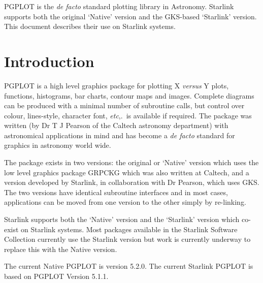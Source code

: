 \documentclass[twoside,11pt]{article}
\newcommand{\stardocinitials}  {SUN}
\newcommand{\stardocnumber}    {15.8}
\newcommand{\stardocabstract}  {PGPLOT is the \emph{de facto} standard plotting
library in Astronomy.  Starlink supports both the original `Native' version and the GKS-based `Starlink' version.  This document describes their use on
Starlink systems.}
\newcommand{\stardocname}{\stardocinitials /\stardocnumber}
\newenvironment{latexonly}{}{}
\newcommand{\xlabel}[1]{}
\renewcommand{\_}{\texttt{\symbol{95}}}
\renewcommand{\thepage}{\roman{page}}
\begin{document}
\stardocabstract
  \newpage
  \begin{latexonly}
    \setlength{\parskip}{0mm}
    \tableofcontents
    \setlength{\parskip}{\medskipamount}
    \markboth{\stardocname}{\stardocname}
  \end{latexonly}
\cleardoublepage
\renewcommand{\thepage}{\arabic{page}}
\setcounter{page}{1}


\section{\xlabel{introduction}Introduction}
\label{introduction}

PGPLOT is a high level graphics package for plotting X \emph{versus} Y
plots, functions, histograms, bar charts, contour maps and images.
Complete diagrams can be produced with a minimal number of subroutine
calls, but control over colour, lines-style, character font,
\emph{etc},.\ is available if required.  The package was written (by Dr
T J Pearson of the Caltech astronomy department) with astronomical
applications in mind and has become a \textit{de facto} standard for
graphics in astronomy world wide.

The package exists in two versions: the original or `Native' version
which uses the low level graphics package GRPCKG which was also
written at Caltech, and a version developed by Starlink, in
collaboration with Dr Pearson, which uses GKS.  The two versions have
identical subroutine interfaces and in most cases, applications can be
moved from one version to the other simply by re-linking.

Starlink supports both the `Native' version and the `Starlink' version
which co-exist on Starlink systems.  Most packages available in the
Starlink Software Collection currently use the Starlink version but
work is currently underway to replace this with the Native version.

The current Native PGPLOT is version 5.2.0.
The current Starlink PGPLOT is based on PGPLOT Version 5.1.1.
\end{document}
